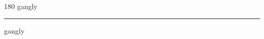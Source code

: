 
\begin{frame}
\begin{center}
\begin{turn}{180}
{\fontsize{2.5cm}{1em}\selectfont gangly}
\end{turn}
\vspace{1em}\par  
\hrule
\vspace{1em}\par  
{\fontsize{2.5cm}{1em}\selectfont gangly}
\end{center}
\end{frame}
